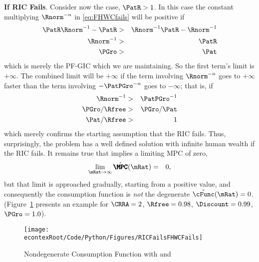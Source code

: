\documentclass[../BufferStockTheory.tex]{subfiles}
\begin{document}
{\bf If RIC Fails}.  Consider now the  case, $\PatR > 1$.  In this case the constant multiplying
$\Rnorm^{-n}$ in \eqref{eq:FHWCfails} will be positive if
\begin{eqnarray*}
  \PatR \Rnorm^{-1} - \PatR & > &  \Rnorm^{-1}\PatR-\Rnorm^{-1}
\\ \Rnorm^{-1} & > & \PatR
\\ \PGro & > & \Pat
\end{eqnarray*}
which is merely the PF-GIC which we are maintaining.  So the first term's limit is $+\infty$.  The
combined limit will be $+\infty$ if the term involving $\Rnorm^{-n}$
goes to $+\infty$ faster than the term involving $-\PatPGro^{-n}$ goes to
$-\infty$; that is, if
\begin{eqnarray*}
  \Rnorm^{-1} & > & \PatPGro^{-1}
\\ \PGro/\Rfree & > & \PGro/\Pat
\\ \Pat/\Rfree & > & 1
\end{eqnarray*}
which merely confirms the starting assumption that the RIC fails.
Thus, surprisingly, the problem has a well defined solution with
infinite human wealth if the RIC fails.  It remains true that 
implies a limiting MPC of zero,
\begin{eqnarray}
  \lim_{\mRat \rightarrow \infty} \mathring{\pmb{\MPC}}(\mRat)  & = & 0,
\end{eqnarray}
but that limit is approached gradually, starting from a positive
value, and consequently the consumption function is {\it not} the
degenerate $\mathring{\cFunc}(\mRat)=0$.  (Figure~\ref{fig:PFGICHoldsFHWCFailsRICFails} presents an example for $\CRRA=2$, $\Rfree=0.98$, $\Discount = 0.99$, $\PGro = 1.0$).

\begin{figure}
\centerline{\texttt{[image: \\econtexRoot/Code/Python/Figures/RICFailsFHWCFails]}}
\caption{Nondegenerate Consumption Function with  and }
\label{fig:PFGICHoldsFHWCFailsRICFails}
\end{figure}
\end{document}
